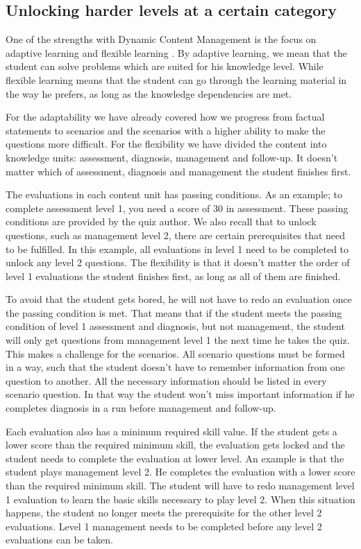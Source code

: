 \subsection{Unlocking harder levels at a certain category}
One of the strengths with Dynamic Content Management is the focus on adaptive learning and flexible learning \parencite{Eide2008}. By adaptive learning, we mean that the student can solve problems which are suited for his knowledge level. While flexible learning means that the student can go through the learning material in the way he prefers, as long as the knowledge dependencies are met.

For the adaptability we have already covered how we progress from factual statements to scenarios and the scenarios with a higher ability to make the questions more difficult. For the flexibility we have divided the content into knowledge units: assessment, diagnosis, management and follow-up. It doesn't matter which of assessment, diagnosis and management the student finishes first.

The evaluations in each content unit has passing conditions. As an example; to complete assessment level 1, you need a score of 30 in assessment. These passing conditions are provided by the quiz author. We also recall that to unlock questions, such as management level 2, there are certain prerequisites that need to be fulfilled. In this example, all evaluations in level 1 need to be completed to unlock any level 2 questions. The flexibility is that it doesn't matter the order of level 1 evaluations the student finishes first, as long as all of them are finished.

To avoid that the student gets bored, he will not have to redo an evaluation once the passing condition is met. That means that if the student meets the passing condition of level 1 assessment and diagnosis, but not management, the student will only get questions from management level 1 the next time he takes the quiz. This makes a challenge for the scenarios. All scenario questions must be formed in a way, such that the student doesn't have to remember information from one question to another. All the necessary information should be listed in every scenario question. In that way the student won't miss important information if he completes diagnosis in a run before management and follow-up. 

Each evaluation also has a minimum required skill value. If the student gets a lower score than the required minimum skill, the evaluation gets locked and the student needs to complete the evaluation at lower level. An example is that the student plays management level 2. He completes the evaluation with a lower score than the required minimum skill. The student will have to redo management level 1 evaluation to learn the basic skills necessary to play level 2. When this situation happens, the student no longer meets the prerequisite for the other level 2 evaluations. Level 1 management needs to be completed before any level 2 evaluations can be taken. 


